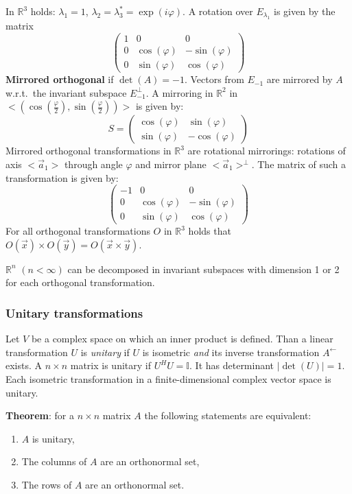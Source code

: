 In $ \mathbb{R}^3$ holds: $\lambda_1=1$, $\lambda_2=\lambda_3^*=\exp(i\varphi)$. A
rotation over $E_{\lambda_1}$ is given by the matrix
\[
\left(\begin{array}{ccc}
1&0&0\\
0&\cos(\varphi)&-\sin(\varphi)\\
0&\sin(\varphi)&\cos(\varphi)
\end{array}\right)
\]
{\bf Mirrored orthogonal} if $\det(A)=-1$. Vectors from $E_{-1}$ are mirrored
by $A$ w.r.t.\ the invariant subspace $E^\perp_{-1}$. A mirroring in $ \mathbb{R}^2$
in $<(\cos(\frac{\varphi}{2}),\sin(\frac{\varphi}{2}))>$ is given by:
\[
S=
\left(\begin{array}{cc}
\cos(\varphi)&\sin(\varphi)\\
\sin(\varphi)&-\cos(\varphi)
\end{array}\right)
\]
Mirrored orthogonal transformations in $ \mathbb{R}^3$ are rotational mirrorings:
rotations of axis $<\vec{a}_1>$ through angle $\varphi$ and mirror plane
$<\vec{a}_1>^\perp$. The matrix of such a transformation is given by:
\[
\left(\begin{array}{ccc}
-1&0&0\\
0&\cos(\varphi)&-\sin(\varphi)\\
0&\sin(\varphi)&\cos(\varphi)
\end{array}\right)
\]
For all orthogonal transformations $O$ in $ \mathbb{R}^3$ holds that
$O(\vec{x})\times O(\vec{y})=O(\vec{x}\times\vec{y})$.
 
$ \mathbb{R}^n$ $(n<\infty)$ can be decomposed in invariant subspaces with dimension
1 or 2 for each orthogonal transformation.

\subsubsection{Unitary transformations}
Let $V$ be a complex space on which an inner product is defined. Than a linear
transformation $U$ is {\it unitary} if $U$ is isometric {\it and} its inverse
transformation $A^\leftarrow$ exists. A $n\times n$ matrix is unitary if
$U^HU= \mathbb{I}$. It has determinant $|\det(U)|=1$. Each isometric transformation
in a finite-dimensional complex vector space is unitary.
 
{\bf Theorem}: for a $n\times n$ matrix $A$ the following statements are
equivalent:
\begin{enumerate}
	\item $A$ is unitary,
	\item The columns of $A$ are an orthonormal set,
	\item The rows of $A$ are an orthonormal set.
\end{enumerate}

